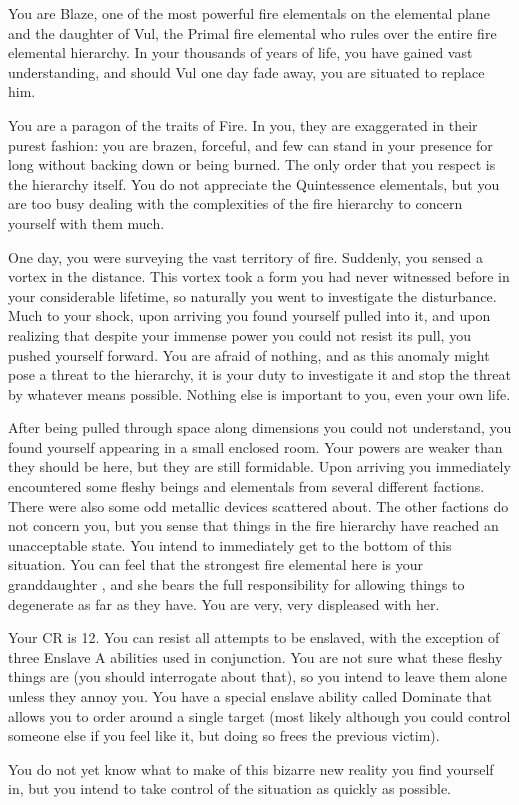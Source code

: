 \documentclass[green]{elementals}
\begin{document}
\name{\cElder{}}

You are Blaze, one of the most powerful fire elementals on the elemental plane and the daughter of Vul, the Primal fire elemental who rules over the entire fire elemental hierarchy. In your thousands of years of life, you have gained vast understanding, and should Vul one day fade away, you are situated to replace him.

You are a paragon of the traits of Fire. In you, they are exaggerated in their purest fashion: you are brazen, forceful, and few can stand in your presence for long without backing down or being burned. The only order that you respect is the hierarchy itself. You do not appreciate the Quintessence elementals, but you are too busy dealing with the complexities of the fire hierarchy to concern yourself with them much.

One day, you were surveying the vast territory of fire. Suddenly, you sensed a vortex in the distance. This vortex took a form you had never witnessed before in your considerable lifetime, so naturally you went to investigate the disturbance. Much to your shock, upon arriving you found yourself pulled into it, and upon realizing that despite your immense power you could not resist its pull, you pushed yourself forward. You are afraid of nothing, and as this anomaly might pose a threat to the hierarchy, it is your duty to investigate it and stop the threat by whatever means possible. Nothing else is important to you, even your own life.

After being pulled through space along dimensions you could not understand, you found yourself appearing in a small enclosed room. Your powers are weaker than they should be here, but they are still formidable. Upon arriving you immediately encountered some fleshy beings and elementals from several different factions. There were also some odd metallic devices scattered about. The other factions do not concern you, but you sense that things in the fire hierarchy have reached an unacceptable state. You intend to immediately get to the bottom of this situation. You can feel that the strongest fire elemental here is your granddaughter \cQueen{\intro}, and she bears the full responsibility for allowing things to degenerate as far as they have. You are very, very displeased with her.

Your CR is 12. You can resist all attempts to be enslaved, with the exception of three Enslave A abilities used in conjunction. You are not sure what these fleshy things are (you should interrogate \cQueen{} about that), so you intend to leave them alone unless they annoy you. You have a special enslave ability called Dominate that allows you to order around a single target (most likely \cQueen{} although you could control someone else if you feel like it, but doing so frees the previous victim).

You do not yet know what to make of this bizarre new reality you find yourself in, but you intend to take control of the situation as quickly as possible. 
\end{document}
